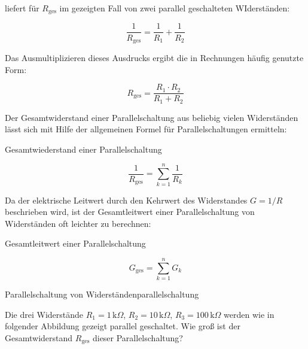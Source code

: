 \begin{frame}
{		liefert für $R_\mathrm{ges}$ im gezeigten Fall von zwei parallel geschalteten WIderständen:

		\begin{equation*}
			\frac{1}{R_\mathrm{ges}} =  \frac{1}{R_1}+\frac{1}{R_2}
		\end{equation*}

		Das Ausmultiplizieren dieses Ausdrucks ergibt die in Rechnungen häufig genutzte Form:

		\begin{equation}
			R_\mathrm{ges} = \frac{R_1\cdot R_2}{R_1 + R_2}
			\label{eq:r2parallel}
		\end{equation}


		Der Gesamtwiderstand einer Parallelschaltung aus beliebig vielen Widerständen lässt sich mit Hilfe der allgemeinen Formel
		für Parallelschaltungen ermitteln:

		\begin{Merksatz}{Gesamtwiederstand einer Parallelschaltung}

			\begin{equation}
				\frac{1}{R_\mathrm{ges}} = \sum_{k=1}^{n} \frac{1}{R_k}
				\label{eq:rparallel}
			\end{equation}
		\end{Merksatz}


		Da der elektrische Leitwert durch den Kehrwert des Widerstandes $G=1/R$ beschrieben wird, ist der Gesamtleitwert einer
		Parallelschaltung von Widerständen oft leichter zu berechnen:



		\begin{Merksatz}{Gesamtleitwert einer Parallelschaltung}

			\begin{equation}
				G_\mathrm{ges} = \sum_{k=1}^{n} G_k
			\end{equation}
		\end{Merksatz}

		\begin{bsp}{Parallelschaltung von Widerständen}{parallelschaltung}

			Die drei Widerstände $R_1 = 1 \, \mathrm{k}\Omega$, $R_2 = 10 \, \mathrm{k}\Omega$, $R_3 = 100 \, \mathrm{k}\Omega$
			werden wie in folgender Abbildung gezeigt parallel geschaltet. Wie groß ist der Gesamtwiderstand $R_\mathrm{ges}$ dieser
			Parallelschaltung?



\end{bsp}}
\end{frame}
